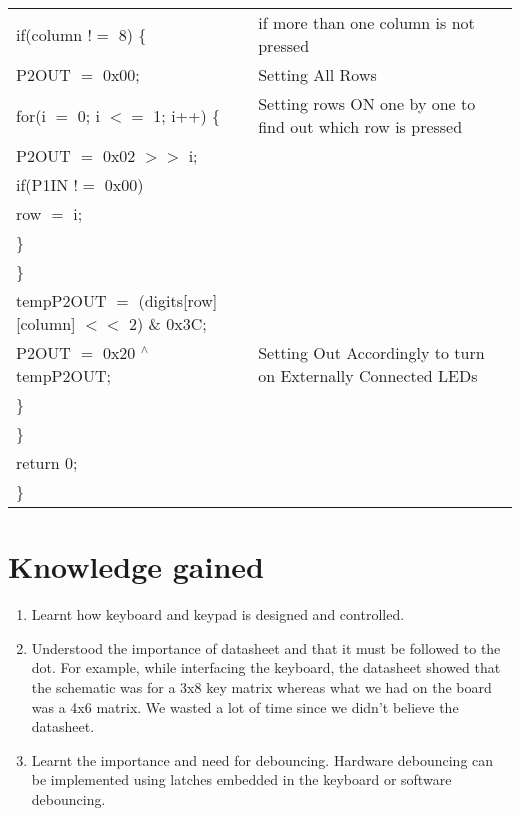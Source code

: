 \documentclass[12pt, letterpaper]{article}
\begin{document}
\begin{longtable}{|p{8cm}||p{6cm}|}
            \hspace{0.3cm}    if(column $!=$ 8) \{  & if more than one column is not pressed \\
            \hspace{0.5cm}     P2OUT $=$ 0x00; & Setting All Rows \\
            \hspace{0.5cm}    for(i $=$ 0; i $<=$ 1; i++) \{ & Setting rows ON one by one to find out which row is pressed\\
            \hspace{0.7cm}    P2OUT $=$ 0x02 $>>$ i; & \\
            \hspace{0.7cm}    if(P1IN $!=$ 0x00) & \\
            \hspace{0.9cm}    row $=$ i;     &  \\
            \hspace{0.7cm}    \} & \\
            \hspace{0.5cm}    \} & \\
            \hspace{0.3cm}    tempP2OUT $=$ (digits[row][column] $<<$ 2) \& 0x3C; & \\
            \hspace{0.3cm}    P2OUT $=$ 0x20 $^\wedge$ tempP2OUT; &  Setting Out Accordingly to turn on Externally Connected LEDs\\
            \hspace{0.3cm}    \} & \\

            \hspace{0.1cm}    \} & \\
            \hspace{0.1cm}     return 0; & \\
            \} & \\

\end{longtable}

\section{Knowledge gained}

\begin{enumerate}
	\item Learnt how keyboard and keypad is designed and controlled.
	
	\item Understood the importance of datasheet and that it must be followed to the dot. For example, while interfacing the keyboard, the datasheet showed that the schematic was for a 3x8 key matrix whereas what we had on the board was a 4x6 matrix. We wasted a lot of time since we didn't believe the datasheet.
	
	\item Learnt the importance and need for debouncing. Hardware debouncing can be implemented using latches embedded in the keyboard or software debouncing. 
	
\end{enumerate}
\end{document}

